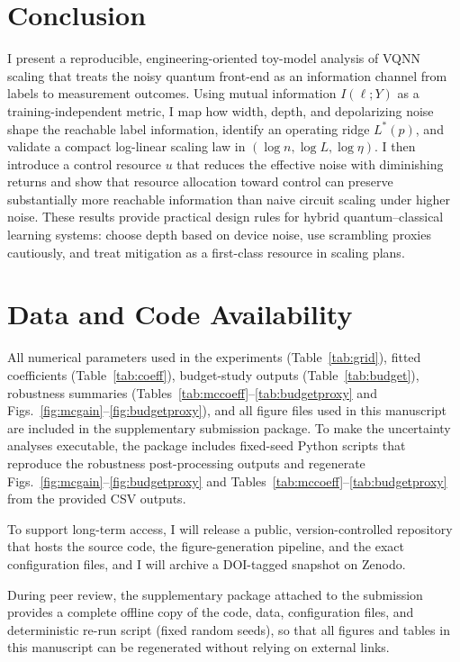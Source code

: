 \documentclass[]{ieeeaccess}
\newcommand{\MI}{I(\ell;Y)}
\begin{document}
\section{Conclusion}
I present a reproducible, engineering-oriented toy-model analysis of VQNN scaling that treats the noisy quantum front-end as an information channel from labels to measurement outcomes. Using mutual information $\MI$ as a training-independent metric, I map how width, depth, and depolarizing noise shape the reachable label information, identify an operating ridge $L^{\ast}(p)$, and validate a compact log-linear scaling law in $(\log n,\log L,\log\eta)$. I then introduce a control resource $u$ that reduces the effective noise with diminishing returns and show that resource allocation toward control can preserve substantially more reachable information than naive circuit scaling under higher noise. These results provide practical design rules for hybrid quantum--classical learning systems: choose depth based on device noise, use scrambling proxies cautiously, and treat mitigation as a first-class resource in scaling plans.

\section*{Data and Code Availability}
All numerical parameters used in the experiments (Table~\ref{tab:grid}), fitted coefficients (Table~\ref{tab:coeff}), budget-study outputs (Table~\ref{tab:budget}), robustness summaries (Tables~\ref{tab:mccoeff}--\ref{tab:budgetproxy} and Figs.~\ref{fig:mcgain}--\ref{fig:budgetproxy}), and all figure files used in this manuscript are included in the supplementary submission package. To make the uncertainty analyses executable, the package includes fixed-seed Python scripts that reproduce the robustness post-processing outputs and regenerate Figs.~\ref{fig:mcgain}--\ref{fig:budgetproxy} and Tables~\ref{tab:mccoeff}--\ref{tab:budgetproxy} from the provided CSV outputs.

To support long-term access, I will release a public, version-controlled repository that hosts the source code, the figure-generation pipeline, and the exact configuration files, and I will archive a DOI-tagged snapshot on Zenodo.

During peer review, the supplementary package attached to the submission provides a complete offline copy of the code, data, configuration files, and deterministic re-run script (fixed random seeds), so that all figures and tables in this manuscript can be regenerated without relying on external links.
\end{document}
